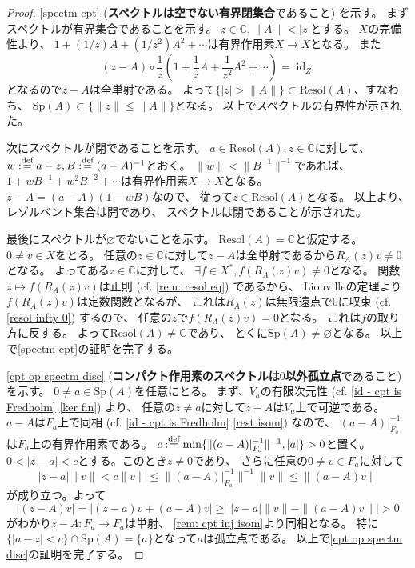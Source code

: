 \documentclass[uplatex]{jsarticle}
\theoremstyle{definition}
\DeclareMathOperator{\id}{\mathrm{id}}
\renewcommand{\emptyset}{\varnothing}
\newcommand{\dfn}{:\overset{\mbox{{\scriptsize def}}}{=}}
\newcommand{\C}{\mathbb{C}}
\newcommand{\resol}{\mathrm{Resol}}
\newcommand{\spectm}{\mathrm{Sp}}
\begin{document}
\begin{proof}
  \ref{spectm cpt} (\textbf{スペクトルは空でない有界閉集合}であること) を示す。
  まずスペクトルが有界集合であることを示す。
  \(z\in \C, \|A\| < |z|\)とする。
  \(X\)の完備性より、
  \(1+(1/z)A+(1/z^2)A^2+\cdots\)は有界作用素\(X\to X\)となる。
  また
  \[
  (z-A)\circ \frac{1}{z}\left(1+\frac{1}{z}A+\frac{1}{z^2}A^2+ \cdots \right) = \id_Z
  \]
  となるので\(z-A\)は全単射である。
  よって\(\{|z| > \|A\|\} \subset \resol(A)\)、すなわち、
  \(\spectm(A) \subset \{\|z\| \leq \|A\|\}\)となる。
  以上でスペクトルの有界性が示された。

  次にスペクトルが閉であることを示す。
  \(a\in \resol(A), z\in \C\)に対して、
  \(w\dfn a-z, B\dfn (a-A)^{-1}\)とおく。
  \(\|w\| < \|B^{-1}\|^{-1}\)であれば、
  \(1 + wB^{-1} + w^2B^{-2} + \cdots\)は有界作用素\(X\to X\)となる。
  \(z-A = (a-A)(1 - wB)\)なので、
  従って\(z\in \resol(A)\)となる。
  以上より、レゾルベント集合は開であり、
  スペクトルは閉であることが示された。

  最後にスペクトルが\(\emptyset\)でないことを示す。
  \(\resol(A)=\C\)と仮定する。
  \(0\neq v\in X\)をとる。
  任意の\(z\in \C\)に対して\(z-A\)は全単射であるから\(R_A(z)v\neq 0\)となる。
  よってある\(z\in \C\)に対して、
  \(\exists f\in X^*, f(R_A(z)v)\neq 0\)となる。
  関数\(z\mapsto f(R_A(z)v)\)は正則 (cf. \autoref{rem: resol eq}) であるから、
  Liouvilleの定理より\(f(R_A(z)v)\)は定数関数となるが、
  これは\(R_A(z)\)は無限遠点で\(0\)に収束 (cf. \autoref{resol infty 0}) するので、
  任意の\(z\)で\(f(R_A(z)v) = 0\)となる。
  これは\(f\)の取り方に反する。
  よって\(\resol(A)\neq \C\)であり、
  とくに\(\spectm(A)\neq \emptyset\)となる。
  以上で\ref{spectm cpt}の証明を完了する。

  \ref{cpt op spectm disc}
  (\textbf{コンパクト作用素のスペクトルは\(0\)以外孤立点}であること)
  を示す。
  \(0\neq a\in \spectm(A)\)を任意にとる。
  まず、\(V_a\)の有限次元性 (cf. \autoref{id - cpt is Fredholm} \ref{ker fin}) より、
  任意の\(z\neq a\)に対して\(z-A\)は\(V_a\)上で可逆である。
  \(a-A\)は\(F_a\)上で同相 (cf. \autoref{id - cpt is Fredholm} \ref{rest isom}) なので、
  \((a-A)|_{F_a}^{-1}\)は\(F_a\)上の有界作用素である。
  \(c\dfn \min\{\|(a-A)|_{F_a}^{-1}\|^{-1},|a|\} > 0\)と置く。
  \(0 < |z-a| < c\)とする。このとき\(z\neq 0\)であり、
  さらに任意の\(0\neq v\in F_a\)に対して
  \[
  |z-a|\|v\| < c\|v\| \leq \|(a-A)|_{F_a}^{-1}\|^{-1}\|v\| \leq \|(a-A)v\|
  \]
  が成り立つ。よって
  \[
  |(z-A)v| = |(z-a)v + (a-A)v| \geq
  \left| |z-a|\|v\| - \|(a-A)v\|\right| > 0
  \]
  がわかり\(z-A:F_a\to F_a\)は単射、
  \autoref{rem: cpt inj isom}より同相となる。
  特に\(\{|a-z|<c\}\cap \spectm(A) = \{a\}\)となって\(a\)は孤立点である。
  以上で\ref{cpt op spectm disc}の証明を完了する。


\end{proof}
\end{document}
